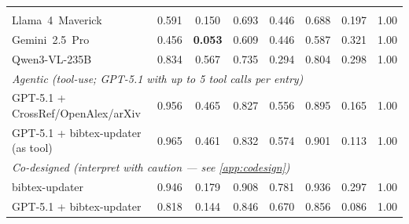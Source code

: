 \begin{table}[t]
{\begin{tabular}{lccccccc}
\addlinespace[2pt]
\multicolumn{8}{l}{\emph{Post-freeze refresh (April 2026; \cref{app:llm-setup})}} \\
Llama~4~Maverick       & 0.591          & 0.150          & 0.693          & 0.446          & 0.688          & 0.197          & 1.00 \\
Gemini~2.5~Pro         & 0.456          & \textbf{0.053} & 0.609          & 0.446          & 0.587          & 0.321          & 1.00 \\
Qwen3-VL-235B          & 0.834          & 0.567          & 0.735          & 0.294          & 0.804          & 0.298          & 1.00 \\
\midrule
\multicolumn{8}{l}{\emph{Agentic (tool-use; GPT-5.1 with up to 5 tool calls per entry)}} \\
GPT-5.1 + CrossRef/OpenAlex/arXiv & 0.956 & 0.465 & 0.827 & 0.556 & 0.895 & 0.165 & 1.00 \\
GPT-5.1 + bibtex-updater (as tool) & 0.965 & 0.461 & 0.832 & 0.574 & 0.901 & 0.113 & 1.00 \\
\midrule
\multicolumn{8}{l}{\emph{Co-designed (interpret with caution --- see \cref{app:codesign})}} \\
bibtex-updater         & 0.946          & 0.179          & 0.908          & 0.781          & 0.936          & 0.297          & 1.00 \\
GPT-5.1 + bibtex-updater & 0.818        & 0.144          & 0.846          & 0.670          & 0.856          & 0.086          & 1.00 \\
\bottomrule
\end{tabular}%
}
\end{table}

